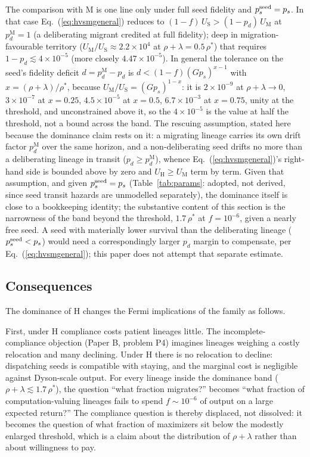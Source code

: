 \documentclass[11pt]{article}
\begin{document}
The comparison with M is one line only under full seed fidelity and $p_s^{\rm seed} = p_s$. In that case Eq.~(\ref{eq:hvsmgeneral}) reduces to $(1-f)\,U_{\mathrm S} > (1-p_{d})\,U_{\mathrm M}$ at $p_d^{\mathrm M} = 1$ (a deliberating migrant credited at full fidelity); deep in migration-favourable territory ($U_{\mathrm M}/U_{\mathrm S} \approx 2.2\times10^{4}$ at $\rho+\lambda = 0.5\,\rho^{*}$) that requires $1 - p_{d} \lesssim 4\times10^{-5}$ (more closely $4.47\times10^{-5}$). In general the tolerance on the seed's fidelity deficit $d = p_d^{\mathrm M} - p_d$ is $d < (1-f)(G p_{s})^{x-1}$ with $x = (\rho+\lambda)/\rho^{*}$, because $U_{\mathrm M}/U_{\mathrm S} = (G p_{s})^{1-x}$: it is $2\times10^{-9}$ at $\rho+\lambda \to 0$, $3\times10^{-7}$ at $x = 0.25$, $4.5\times10^{-5}$ at $x = 0.5$, $6.7\times10^{-3}$ at $x = 0.75$, unity at the threshold, and unconstrained above it, so the $4\times10^{-5}$ is the value at half the threshold, not a bound across the band. The rescuing assumption, stated here because the dominance claim rests on it: a migrating lineage carries its own drift factor $p_{d}^{\mathrm M}$ over the same horizon, and a non-deliberating seed drifts no more than a deliberating lineage in transit ($p_{d} \geq p_{d}^{\mathrm M}$), whence Eq.~(\ref{eq:hvsmgeneral})'s right-hand side is bounded above by zero and $U_{\mathrm H} \geq U_{\mathrm M}$ term by term. Given that assumption, and given $p_s^{\rm seed} = p_s$ (Table~\ref{tab:params}: adopted, not derived, since seed transit hazards are unmodelled separately), the dominance itself is close to a bookkeeping identity; the substantive content of this section is the narrowness of the band beyond the threshold, $1.7\,\rho^{*}$ at $f = 10^{-6}$, given a nearly free seed. A seed with materially lower survival than the deliberating lineage ($p_s^{\rm seed} < p_s$) would need a correspondingly larger $p_d$ margin to compensate, per Eq.~(\ref{eq:hvsmgeneral}); this paper does not attempt that separate estimate.

\subsection{Consequences}

The dominance of H changes the Fermi implications of the family as follows.

First, under H compliance costs patient lineages little. The incomplete-compliance objection (Paper B, problem P4) imagines lineages weighing a costly relocation and many declining. Under H there is no relocation to decline: dispatching seeds is compatible with staying, and the marginal cost is negligible against Dyson-scale output. For every lineage inside the dominance band ($\rho+\lambda \lesssim 1.7\,\rho^{*}$), the question ``what fraction migrates?'' becomes ``what fraction of computation-valuing lineages fails to spend $f \sim 10^{-6}$ of output on a large expected return?'' The compliance question is thereby displaced, not dissolved: it becomes the question of what fraction of maximizers sit below the modestly enlarged threshold, which is a claim about the distribution of $\rho + \lambda$ rather than about willingness to pay.
\end{document}

